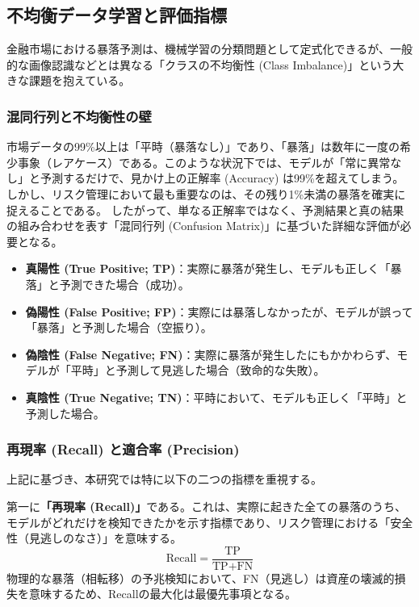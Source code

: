 \documentclass[11pt,a4paper,oneside]{ltjsarticle}
\begin{document}
\subsection{不均衡データ学習と評価指標}
金融市場における暴落予測は、機械学習の分類問題として定式化できるが、一般的な画像認識などとは異なる「クラスの不均衡性 (Class Imbalance)」という大きな課題を抱えている。

\subsubsection{混同行列と不均衡性の壁}
市場データの99\%以上は「平時（暴落なし）」であり、「暴落」は数年に一度の希少事象（レアケース）である。このような状況下では、モデルが「常に異常なし」と予測するだけで、見かけ上の正解率 (Accuracy) は99\%を超えてしまう。しかし、リスク管理において最も重要なのは、その残り1\%未満の暴落を確実に捉えることである。
したがって、単なる正解率ではなく、予測結果と真の結果の組み合わせを表す「混同行列 (Confusion Matrix)」に基づいた詳細な評価が必要となる。

\begin{itemize}
    \item \textbf{真陽性 (True Positive; TP)}：実際に暴落が発生し、モデルも正しく「暴落」と予測できた場合（成功）。
    \item \textbf{偽陽性 (False Positive; FP)}：実際には暴落しなかったが、モデルが誤って「暴落」と予測した場合（空振り）。
    \item \textbf{偽陰性 (False Negative; FN)}：実際に暴落が発生したにもかかわらず、モデルが「平時」と予測して見逃した場合（致命的な失敗）。
    \item \textbf{真陰性 (True Negative; TN)}：平時において、モデルも正しく「平時」と予測した場合。
\end{itemize}

\subsubsection{再現率 (Recall) と適合率 (Precision)}
上記に基づき、本研究では特に以下の二つの指標を重視する。

第一に\textbf{「再現率 (Recall)」}である。これは、実際に起きた全ての暴落のうち、モデルがどれだけを検知できたかを示す指標であり、リスク管理における「安全性（見逃しのなさ）」を意味する。
\begin{equation}
\text{Recall} = \frac{\text{TP}}{\text{TP} + \text{FN}}
\end{equation}
物理的な暴落（相転移）の予兆検知において、FN（見逃し）は資産の壊滅的損失を意味するため、Recallの最大化は最優先事項となる。
\end{document}
